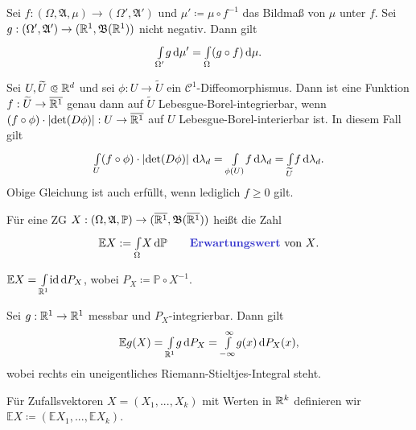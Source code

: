 \documentclass{cheat-sheet}
\newcommand{\Alg}{\mathfrak{A}} %
\renewcommand{\P}{\mathbb{P}} %
\newcommand{\E}{\mathbb{E}} %
\newcommand{\Bor}{\mathfrak{B}} %
\renewcommand{\ER}{\overline{\R^1}} %
\begin{document}

\begin{satz}
  Sei $f : (\Omega, \Alg, \mu) \to (\Omega', \Alg')$ und $\mu' \coloneqq \mu \circ f^{-1}$ das Bildmaß von $\mu$ unter $f$. Sei $g : (\Omega', \Alg') \to (\R^1, \Bor(\R^1))$ nicht negativ. Dann gilt
  \[ {\textstyle \int\limits_{\Omega'}^{}} g \,\mathrm{d} \mu' = {\textstyle \int\limits_{\Omega}^{}} (g \circ f) \,\mathrm{d} \mu. \]
\end{satz}


\begin{satz}[Transformationssatz]
  Sei $U, \widetilde{U} \opn \R^d$ und sei $\phi : U \to \widetilde{U}$ ein $\mathcal{C}^1$-Diffeomorphismus. Dann ist eine Funktion $f : \widetilde{U} \to \ER$ genau dann auf $\widetilde{U}$ Lebesgue-Borel-integrierbar, wenn $(f \circ \phi) \cdot \left|\det(D\phi)\right| : U \to \ER$ auf $U$ Lebesgue-Borel-interierbar ist. In diesem Fall gilt
  \[ {\textstyle \int\limits_{U}^{}} (f \circ \phi) \cdot \left|\det(D\phi)\right| \,\mathrm{d} \lambda_d = {\textstyle \int\limits_{\phi(U)}^{}} f \,\mathrm{d} \lambda_d = {\textstyle \int\limits_{\widetilde{U}}^{}} f \,\mathrm{d} \lambda_d. \]
  Obige Gleichung ist auch erfüllt, wenn lediglich $f \geq 0$ gilt.
\end{satz}

\begin{defn}
  Für eine ZG $X : (\Omega, \Alg, \P) \to (\ER, \Bor(\ER))$ heißt die Zahl
  \[ \E X := \Int{\Omega}{}{X}{\P} \qquad \text{\emph{Erwartungswert} von $X$.} \]
\end{defn}

\begin{satz}
  $\E X = \Int{\R^1}{}{\id}{P_X}$, wobei $P_X \coloneqq \P \circ X^{-1}$.
\end{satz}

\begin{kor}
  Sei $g : \mathbb{R}^1 \to \mathbb{R}^1$ messbar und $P_X$-integrierbar. Dann gilt
  \[ \E g(X) = \Int{\R^1}{}{g}{P_X} = \Int{-\infty}{\infty}{g(x)}{P_X(x)}, \]
  wobei rechts ein uneigentliches Riemann-Stieltjes-Integral steht.
\end{kor}

\begin{defn}
  Für Zufallsvektoren $X = (X_1, ..., X_k)$ mit Werten in $\mathbb{R}^k$ definieren wir $\E X \coloneqq (\E X_1, ..., \E X_k)$.
\end{defn}
\end{document}
